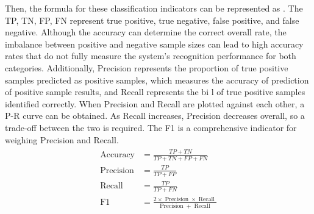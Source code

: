 Then, the formula for these classification indicators can be represented as \eqname{\ref{fml:ch3-conmat}}. The TP, TN, FP, FN represent true positive, true negative, false positive, and false negative. Although the accuracy can determine the correct overall rate, the imbalance between positive and negative sample sizes can lead to high accuracy rates that do not fully measure the system's recognition performance for both categories. Additionally, Precision represents the proportion of true positive samples predicted as positive samples, which measures the accuracy of prediction of positive sample results, and Recall represents the bi l of true positive samples identified correctly. When Precision and Recall are plotted against each other, a P-R curve can be obtained. As Recall increases, Precision decreases overall, so a trade-off between the two is required. The F1 is a comprehensive indicator for weighing Precision and Recall.
\begin{align}\label{fml:ch3-conmat}
    \begin{split}
        \operatorname{Accuracy} &= \frac{TP+TN}{TP+TN+FP+FN} \\
        \operatorname{Precision} &= \frac{TP}{TP+FP} \\
        \operatorname{Recall} &= \frac{TP}{TP+FN} \\
        \operatorname{F1} &= \frac{2\times \operatorname{Precision}\times\operatorname{Recall}}{\operatorname{Precision}+\operatorname{Recall}}
    \end{split}
\end{align}
